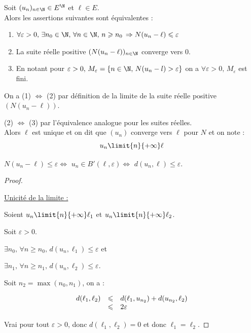 \begin{definition}{}{}
    Soit $(u_n)_{n \in \N} \in E^{\N}$ et $\ell \in E$. \\

    Alors les assertions suivantes sont équivalentes : 

    \begin{enumerate}
        \item $\forall \varepsilon > 0, \, \exists n_0 \in \N, \, \forall n \in \N, \, n \geqslant n_0 \, \Rightarrow N(u_n - \ell) \leqslant \varepsilon$
        \item La suite réelle positive $(N(u_n - \ell))_{n \in \N}$ converge vers 0.
        \item En notant pour $\varepsilon > 0, \, M_\varepsilon = \{n \in \N, \, N(u_n - l) > \varepsilon\}$ on a
            $\forall \varepsilon > 0, \, M_\varepsilon$ est fini. \\
    \end{enumerate}

    On a (1) $\iff$ (2) par définition de la limite de la suite réelle positive $(N(u_n - \ell))$.

    (2) $\iff$ (3) par l'équivalence analogue pour les suites réelles.\\

    Alors $\ell$ est unique et on dit que $(u_n)$ converge vers $\ell$ pour $N$ et on note :
    $$ u_n \limit{n}{+\infty} \ell $$
\end{definition}

\begin{remarque}
    $N(u_n - \ell) \leqslant \varepsilon \iff$ $u_n \in B'(\ell, \varepsilon) \iff$ $d(u_n, \ell) \leqslant \varepsilon$.
\end{remarque}


\begin{proof}~

    \uline{Unicité de la limite :}

    \avspace Soient $u_n \limit{n}{+\infty} \ell_1$ et $u_n \limit{n}{+\infty} \ell_2$.

    Soit $\varepsilon > 0$. 

    $\exists n_0, \, \forall n \geqslant n_0, \, d(u_n, \ell_1) \leqslant \varepsilon$ et

    $\exists n_1, \, \forall n \geqslant n_1, \, d(u_n, \ell_2) \leqslant \varepsilon$.

    Soit $n_2 = \max(n_0, n_1)$, on a :

    $$\begin{array}{rcl}
        d(\ell_1, \ell_2) & \leqslant & d(\ell_1, u_{n_2}) + d(u_{n_2}, \ell_2) \\
        \space & \leqslant & 2\varepsilon \\
    \end{array}$$

    Vrai pour tout $\varepsilon > 0$, donc $d(\ell_1, \ell_2) = 0$ et donc $\ell_1 = \ell_2$.
\end{proof}


